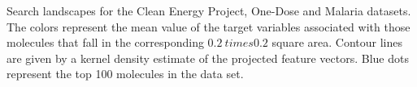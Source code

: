 Search landscapes for the Clean Energy Project, One-Dose and Malaria datasets.  
The colors represent the mean value of the target variables associated with those molecules that fall in the corresponding $0.2 \ times 0.2$ square area. Contour lines are given by a kernel density estimate of the projected feature vectors. Blue dots represent the top 100 molecules in the data set.
\label{fig:info_landscapes}